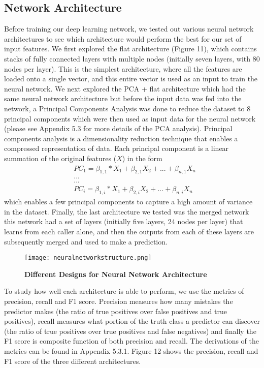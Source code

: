 \documentclass{article}
\begin{document}
\subsection{Network Architecture}
Before training our deep learning network, we tested out various neural network architectures to see which architecture would perform the best for our set of input features. We first explored the flat architecture (Figure 11), which contains stacks of fully connected layers with multiple nodes (initially seven layers, with 80 nodes per layer). This is the simplest architecture, where all the features are loaded onto a single vector, and this entire vector is used as an input to train the neural network. We next explored the PCA + flat architecture which had the same neural network architecture but before the input data was fed into the network, a Principal Components Analysis was done to reduce the dataset to 8 principal components which were then used as input data for the neural network (please see Appendix 5.3 for more details of the PCA analysis). Principal components analysis is a dimensionality reduction technique that enables a compressed representation of data. Each principal component is a linear summation of the original features ($X$) in the form 
\begin{align*}
&PC_1 = \beta_{1,1}*X_{1} + \beta_{2,1} X_{2} +... + \beta_{n,1} X_n \\
&... \\
&... \\
&PC_i = \beta_{1,i}*X_{1} + \beta_{2,i} X_{2} +... + \beta_{n,i} X_n
\end{align*}
which enables a few principal components to capture a high amount of variance in the dataset.
Finally, the last architecture we tested was the merged network this network had a set of layers (initially five layers, 24 nodes per layer) that learns from each caller alone, and then the outputs from each of these layers are subsequently merged and used to make a prediction. 
\begin{figure}[H]
\texttt{[image: neuralnetworkstructure.png]}
\centering
\caption{\textbf{Different Designs for Neural Network Architecture}}
\end{figure}
To study how well each architecture is able to perform, we use the metrics of precision, recall and F1 score. Precision measures how many mistakes the predictor makes (the ratio of true positives over false positives and true positives), recall measures what portion of the truth class a predictor can discover (the ratio of true positives over true positives and false negatives) and finally the F1 score is composite function of both precision and recall. The derivations of the metrics can be found in Appendix 5.3.1. Figure 12 shows the precision, recall and F1 score of the three different architectures.
\end{document}
